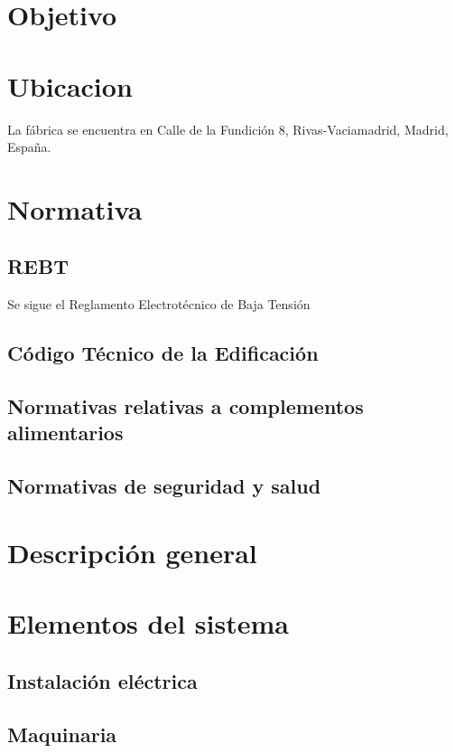 \section{Objetivo}

\section{Ubicacion}

La fábrica se encuentra en Calle de la Fundición 8, Rivas-Vaciamadrid, Madrid, España.


\section{Normativa}

\subsection{REBT}

Se sigue el Reglamento Electrotécnico de Baja Tensión

\subsection{Código Técnico de la Edificación}

\subsection{Normativas relativas a complementos alimentarios}

\subsection{Normativas de seguridad y salud}

\section{Descripción general}
 
 
 
\section{Elementos del sistema}

\subsection{Instalación eléctrica}
\subsection{Maquinaria}
